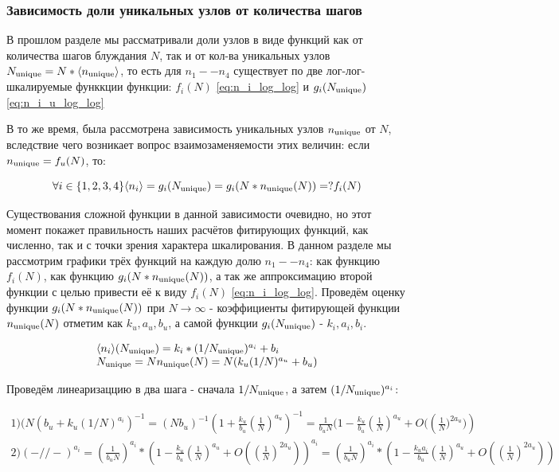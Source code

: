 \subsubsection{Зависимость доли уникальных узлов от количества шагов}

В прошлом разделе мы рассматривали доли узлов в виде функций как от количества шагов блуждания $N$, так и от кол-ва уникальных узлов $N_{\textup{unique}} = N * \langle n_{\textup{unique}} \rangle$, то есть для $n_1 -- n_4$ существует по две лог-лог-шкалируемые функкции функции: $f_i(N)$ \ref{eq:n_i_log_log} и $g_i(N_{\textup{unique}})$ \ref{eq:n_i_u_log_log}

В то же время, была рассмотрена зависимость уникальных узлов $n_{\textup{unique}}$ от $N$, вследствие чего возникает вопрос взаимозаменяемости этих величин: если $n_{\textup{unique}} = f_u(N)$, то:

\[ \forall i \in \{1,2,3,4\} \langle n_i \rangle = g_i(N_{\textup{unique}}) = g_i(N * n_{\textup{unique}}(N))  =? f_i(N) \]

Существования сложной функции в данной зависимости очевидно, но этот момент покажет правильность наших расчётов фитирующих функций, как численно, так и с точки зрения характера шкалирования.
В данном разделе мы рассмотрим графики трёх функций на каждую долю $n_1 -- n_4$: как функцию $f_i(N)$, как функцию $g_i(N*n_{\textup{unique}}(N))$, а так же аппроксимацию второй функции с целью привести её к виду $f_i(N)$ \ref{eq:n_i_log_log}.
Проведём оценку функции $g_i(N*n_{\textup{unique}}(N))$ при $N \to \infty$ - коэффициенты фитирующей функции $n_{\textup{unique}}(N)$ отметим как $k_u, a_u, b_u$, а самой функции $g_i(N_{\textup{unique}})$ - $k_i, a_i, b_i$.

\begin{large}
\begin{equation*}
\begin{array}{l}
\langle n_i \rangle (N_{\textup{unique}}) = k_i * (1/N_{\textup{unique}})^{a_i} + b_i \\
N_{\textup{unique}} = N n_{\textup{unique}}(N) = N (k_u (1/N)^{a_u} + b_u) \\
\end{array}
\end{equation*}	
\end{large}

Проведём линеаризаццию в два шага - сначала $1/N_{\textup{unique}}$, а затем $(1/N_{\textup{unique}})^{a_i}$:

\begin{large}
\begin{equation*}
\begin{array}{l}
1) (N (b_u + k_u(1/N)^{a_i})^{-1} = ( N b_u)^{-1} (1 + \frac{k_u}{b_u} (\frac{1}{N})^{a_u})^{-1} = \frac{1}{b_u N} (1 - \frac{k_u}{b_u} (\frac{1}{N})^{a_u} + O(\left(\frac{1}{N})^{2a_u})\right) \\

2) ( - // - )^{a_i}  = (\frac{1}{b_u N})^{a_i} * (1 - \frac{k_u}{b_u} (\frac{1}{N})^{a_u} + O(\left(\frac{1}{N}\right)^{2a_u}))^{a_i} =  (\frac{1}{b_u N})^{a_i} * (1 - \frac{k_u a_i}{b_u} (\frac{1}{N})^{a_u} + O(\left(\frac{1}{N}\right)^{2a_u}))
\end{array}
\end{equation*}
\end{large}

